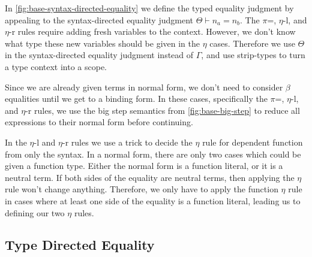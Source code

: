 \documentclass[sigplan,nonacm]{acmart}
\newcommand{\stxEqJ}[3]{#1 \vdash #2 = #3}
\begin{document}
In \autoref{fig:base-syntax-directed-equality} we define the typed equality judgment by appealing to the syntax-directed equality judgment $\stxEqJ{\Theta}{n_a}{n_b}$.
The $\pi$=, $\eta$-l, and $\eta$-r rules require adding fresh variables to the context.
However, we don't know what type these new variables should be given in the $\eta$ cases.
Therefore we use $\Theta$ in the syntax-directed equality judgment instead of $\Gamma$, and use strip-types to turn a type context into a scope.

Since we are already given terms in normal form, we don't need to consider $\beta$ equalities until we get to a binding form.
In these cases, specifically the $\pi$=, $\eta$-l, and $\eta$-r rules, we use the big step semantics from \autoref{fig:base-big-step} to reduce all expressions to their normal form before continuing.

In the $\eta$-l and $\eta$-r rules we use a trick to decide the $\eta$ rule for dependent function from only the syntax.
In a normal form, there are only two cases which could be given a function type.
Either the normal form is a function literal, or it is a neutral term.
If both sides of the equality are neutral terms, then applying the $\eta$ rule won't change anything.
Therefore, we only have to apply the function $\eta$ rule in cases where at least one side of the equality is a function literal, leading us to defining our two $\eta$ rules.

\subsection{Type Directed Equality}
\end{document}

